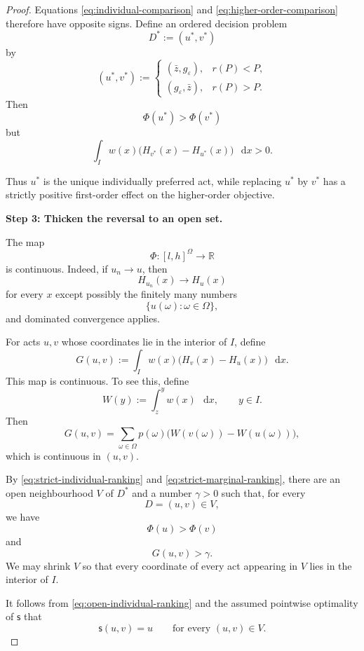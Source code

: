 \documentclass[a4paper,final]{article}
\newcommand\s{\mathsf{s}}
\newcommand*\diff{\mathop{}\!\mathrm{d}}
\newenvironment{CCM rewritten}
{\begingroup\color{blue}} %
{\endgroup}              %
\begin{document}
\begin{proof}
Equations
\eqref{eq:individual-comparison} and
\eqref{eq:higher-order-comparison} therefore have opposite signs.
Define an ordered decision problem
\[
D^*:=(u^*,v^*)
\]
by
\[
(u^*,v^*)
:=
\begin{cases}
(\bar z,g_\varepsilon),
&
r(P)<P,\\[3pt]
(g_\varepsilon,\bar z),
&
r(P)>P.
\end{cases}
\]
Then
\begin{equation}
\Phi(u^*)>\Phi(v^*)
\label{eq:strict-individual-ranking}
\end{equation}
but
\begin{equation}
\int_I
w(x)\bigl(H_{v^*}(x)-H_{u^*}(x)\bigr)
\,\diff x
>0.
\label{eq:strict-marginal-ranking}
\end{equation}

Thus \(u^*\) is the unique individually preferred act, while replacing
\(u^*\) by \(v^*\) has a strictly positive first-order effect on the
higher-order objective.

\medskip
\noindent
\textbf{Step 3: Thicken the reversal to an open set.}

The map
\[
\Phi:[l,h]^\Omega\longrightarrow\mathbb R
\]
is continuous. Indeed, if \(u_n\to u\), then
\[
H_{u_n}(x)\longrightarrow H_u(x)
\]
for every \(x\) except possibly the finitely many numbers
\[
\{u(\omega):\omega\in\Omega\},
\]
and dominated convergence applies.

For acts \(u,v\) whose coordinates lie in the interior of \(I\), define
\[
G(u,v)
:=
\int_I
w(x)\bigl(H_v(x)-H_u(x)\bigr)
\,\diff x.
\]
This map is continuous. To see this, define
\[
W(y):=\int_z^y w(x)\,\diff x,
\qquad y\in I.
\]
Then
\[
G(u,v)
=
\sum_{\omega\in\Omega}
p(\omega)
\bigl(W(v(\omega))-W(u(\omega))\bigr),
\]
which is continuous in \((u,v)\).

By
\eqref{eq:strict-individual-ranking} and
\eqref{eq:strict-marginal-ranking}, there are an open neighbourhood
\(V\) of \(D^*\) and a number \(\gamma>0\) such that, for every
\[
D=(u,v)\in V,
\]
we have
\begin{equation}
\Phi(u)>\Phi(v)
\label{eq:open-individual-ranking}
\end{equation}
and
\begin{equation}
G(u,v)>\gamma.
\label{eq:open-marginal-ranking}
\end{equation}
We may shrink \(V\) so that every coordinate of every act appearing
in \(V\) lies in the interior of \(I\).

It follows from \eqref{eq:open-individual-ranking} and the assumed
pointwise optimality of \(\s\) that
\[
\s(u,v)=u
\qquad
\text{for every }(u,v)\in V.
\]


\end{proof}
\end{document}
